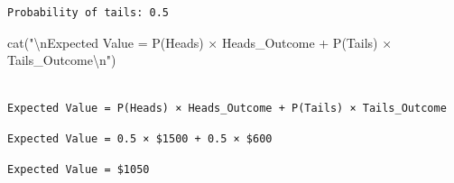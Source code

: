 \documentclass[
  letterpaper,
  DIV=11,
  numbers=noendperiod]{scrartcl}
\newenvironment{Shaded}{\begin{snugshade}}{\end{snugshade}}
\newcommand{\AttributeTok}[1]{\textcolor[rgb]{0.40,0.45,0.13}{#1}}
\newcommand{\DecValTok}[1]{\textcolor[rgb]{0.68,0.00,0.00}{#1}}
\newcommand{\FunctionTok}[1]{\textcolor[rgb]{0.28,0.35,0.67}{#1}}
\newcommand{\NormalTok}[1]{\textcolor[rgb]{0.00,0.23,0.31}{#1}}
\newcommand{\SpecialCharTok}[1]{\textcolor[rgb]{0.37,0.37,0.37}{#1}}
\newcommand{\StringTok}[1]{\textcolor[rgb]{0.13,0.47,0.30}{#1}}
\begin{document}
\begin{verbatim}
Probability of tails: 0.5
\end{verbatim}

\begin{Shaded}
\begin{Highlighting}[]
\FunctionTok{cat}\NormalTok{(}\StringTok{"}\SpecialCharTok{\textbackslash{}n}\StringTok{Expected Value = P(Heads) × Heads\_Outcome + P(Tails) × Tails\_Outcome}\SpecialCharTok{\textbackslash{}n}\StringTok{"}\NormalTok{)}
\end{Highlighting}
\end{Shaded}

\begin{verbatim}

Expected Value = P(Heads) × Heads_Outcome + P(Tails) × Tails_Outcome
\end{verbatim}

\begin{Shaded}
\end{Shaded}

\begin{verbatim}
Expected Value = 0.5 × $1500 + 0.5 × $600
\end{verbatim}

\begin{Shaded}
\end{Shaded}

\begin{verbatim}
Expected Value = $1050
\end{verbatim}

\begin{Shaded}
\end{Shaded}
\end{document}
